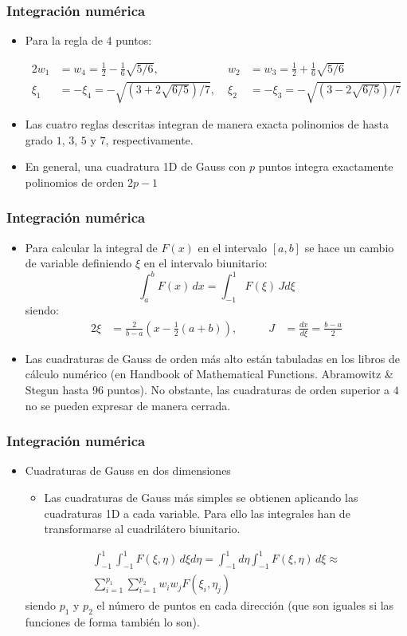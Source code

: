 \documentclass{beamer}
\begin{document}
\begin{frame}
\frametitle{Integración numérica}
\begin{itemize}
\item Para la regla de $4$ puntos:
\begin{small}
\begin{alignat*}{2}
w_1&=w_4=\frac{1}{2}-\frac{1}{6}\sqrt{5/6}, \; &
w_2&=w_3=\frac{1}{2}+\frac{1}{6}\sqrt{5/6}  \\
\xi_1&=-\xi_4=-\sqrt{(3+2\sqrt{6/5})/7}, \; &
\xi_2&=-\xi_3=-\sqrt{(3-2\sqrt{6/5})/7}
\end{alignat*}
\end{small}
\item Las cuatro reglas descritas integran de manera exacta polinomios de hasta
grado $1$, $3$, $5$ y $7$, respectivamente.
\item En general, una cuadratura 1D de Gauss con $p$ puntos integra
exactamente polinomios de orden $2p-1$
\end{itemize}
\end{frame}
\begin{frame}
\frametitle{Integración numérica}
\begin{itemize}
\item Para calcular la integral de $F(x)$ en el intervalo $[a,b]$ se hace
un cambio de variable definiendo $\xi$ en el intervalo biunitario:
$$
\int_a^b F(x) \, dx = \int_{-1}^1 F(\xi) \, J d\xi
$$
siendo:
\begin{alignat*}{2}
\xi&=\frac{2}{b-a} \left( x-\frac{1}{2} (a+b) \right), \qquad &
J&=\frac{dx}{d\xi}=\frac{b-a}{2}
\end{alignat*}
\item Las cuadraturas de Gauss de orden más alto están tabuladas en los
libros de cálculo numérico (en {\sc Handbook of Mathematical Functions.
Abramowitz \& Stegun} hasta 96 puntos). No obstante, las cuadraturas de 
orden superior a $4$ no se pueden expresar de manera cerrada.
\end{itemize}
\end{frame}
\begin{frame}
\frametitle{Integración numérica}
\begin{itemize}
\item Cuadraturas de Gauss en dos dimensiones
\begin{itemize}
\item Las cuadraturas de Gauss más simples se obtienen aplicando las
cuadraturas 1D a cada variable. Para ello las integrales han de transformarse
al cuadrilátero biunitario.
\end{itemize}
\begin{multline*}
\int_{-1}^1 \int_{-1}^1 F(\xi,\eta) \, d \xi d\eta=
\int_{-1}^1 d \eta \int_{-1}^1 F(\xi,\eta) \, d \xi \approx \\
\sum_{i=1}^{p_1} \sum_{i=1}^{p_2} w_i w_j F(\xi_i,\eta_j)
\end{multline*}
siendo $p_1$ y $p_2$ el número de puntos en cada dirección (que son
iguales si las funciones de forma también lo son).
\end{itemize}
\end{frame}
\end{document}
